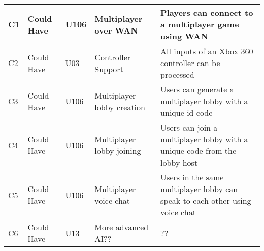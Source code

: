 \documentclass{article} %
\begin{document}
\begin{longtable}{|p{}|p{}|p{}|p{}|p{}|}
    C1 & Could Have & U106 & Multiplayer over WAN & Players can connect to a multiplayer game using WAN \\ \hline
    C2 & Could Have & U03 & Controller Support & All inputs of an Xbox 360 controller can be processed \\ \hline
    C3 & Could Have & U106 & Multiplayer lobby creation & Users can generate a multiplayer lobby with a unique id code \\ \hline
    C4 & Could Have & U106 & Multiplayer lobby joining & Users can join a multiplayer lobby with a unique code from the lobby host \\ \hline
    C5 & Could Have & U106 & Multiplayer voice chat & Users in the same multiplayer lobby can speak to each other using voice chat \\ \hline
    C6 & Could Have & U13 & More advanced AI?? & ?? \\ \hline

\end{longtable}
\newpage
\end{document}
